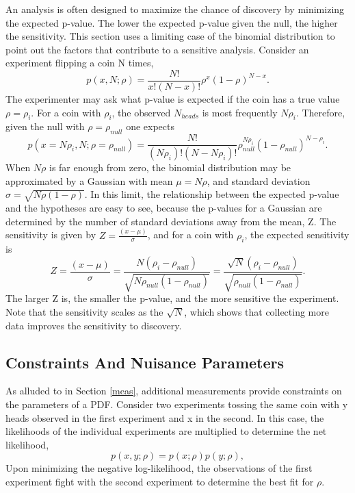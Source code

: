 \documentclass[12pt]{article}
\begin{document}
An analysis is often designed to maximize the chance of discovery by minimizing the expected p-value. The lower the expected p-value given the null, the higher the sensitivity. This section uses a limiting case of the binomial distribution to point out the factors that contribute to a sensitive analysis. Consider an experiment flipping a coin N times, 
\begin{equation}
p(x,N;\rho) = \frac{N!}{x! (N - x)!}\rho^{x}(1-\rho)^{N-x}.
\end{equation}
The experimenter may ask what p-value is expected if the coin has a true value $\rho=\rho_i$. For a coin with $\rho_i$, the observed $N_{heads}$ is most frequently $N\rho_i$. Therefore, given the null with $\rho=\rho_{null}$ one expects
\begin{equation}
p(x=N\rho_i,N;\rho=\rho_{null}) = \frac{N!}{(N\rho_i)! (N - N\rho_i)!}\rho_{null}^{N\rho_i}(1-\rho_{null})^{N-\rho_i}.
\end{equation}
When $N\rho$ is far enough from zero, the binomial distribution may be approximated by a Gaussian with mean $\mu=N\rho$, and standard deviation $\sigma=\sqrt{N\rho(1-\rho)}$. In this limit, the relationship between the expected p-value and the hypotheses are easy to see, because the p-values for a Gaussian are determined by the number of standard deviations away from the mean, Z. The sensitivity is given by $Z=\frac{(x-\mu)}{\sigma}$, and for a coin with $\rho_i$, the expected sensitivity is 
\begin{equation}
Z = \frac{(x-\mu)}{\sigma} = \frac{N(\rho_i - \rho_{null})}{\sqrt{N\rho_{null}(1-\rho_{null})}} = \frac{\sqrt{N}(\rho_i - \rho_{null})}{\sqrt{\rho_{null}(1-\rho_{null})}}.
\end{equation}
The larger Z is, the smaller the p-value, and the more sensitive the experiment. Note that the sensitivity scales as the $\sqrt{N}$, which shows that collecting more data improves the sensitivity to discovery. 

\subsection{Constraints And Nuisance Parameters}
\label{constraints}

As alluded to in Section \ref{meas}, additional measurements provide constraints on the parameters of a PDF. Consider two experiments tossing the same coin with y heads observed in the first experiment and x in the second. In this case, the likelihoods of the individual experiments are multiplied to determine the net likelihood, 
\begin{equation}
p(x, y; \rho) = p(x; \rho)p(y; \rho),
\end{equation}
Upon minimizing the negative log-likelihood, the observations of the first experiment fight with the second experiment to determine the best fit for $\rho$. 
\end{document}
